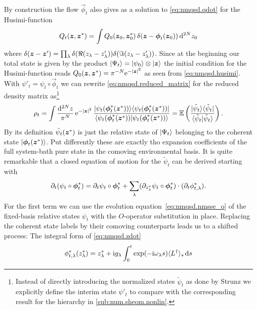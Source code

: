 By construction the flow $\vec\phi_t$ also gives as a solution to \autoref{eq:nmqsd.qdot} for the Husimi-function
\begin{equation*}
  Q_t(\boldsymbol{z}, {\boldsymbol{z}}^*) = \int Q_0(\boldsymbol{z}_0, {\boldsymbol{z}}^*_0) \, \delta(\boldsymbol{z} - \boldsymbol{\phi}_t(\boldsymbol{z}_0)) \, \mathrm{d}^{2N} z_0
\end{equation*}
where $\delta(\boldsymbol{z} - \boldsymbol{z}') = \prod_\lambda \delta(\Re(z_\lambda - z_\lambda')) \delta(\Im(z_\lambda - z_\lambda'))$.
Since at the beginning our total state is given by the product $| \Psi_t \rangle = | \psi_0 \rangle \otimes | \boldsymbol{z} \rangle$ the initial condition for the Husimi-function reads $Q_0(\zz, \cc\zz) = \pi^{-N} \exp[-\abs{\zz}^2]$ as seen from \autoref{eq:nmqsd.husimi}.
With $\psi'_t = \psi_t \circ \vec\phi_t$ we can rewrite \autoref{eq:nmqsd.reduced_matrix} for the reduced density matrix as\footnote{Instead of directly introducing the normalized states $\tilde\psi_t$ as done by Strunz \cite{St01_habil} we explicitly define the interim state $\psi'_t$ to compare with the corresponding result for the hierarchy in \autoref{sub:num.sheom.nonlin}.}
\begin{equation}
  \rho_t = \int \frac{\mathrm{d}^{2N}z}{\pi^N} \, \exp[-\abs{\zz}^2] \, \frac{\ket\psitphi \bra\psitphi}{\braket{\psitphi}{\psitphi}}
         = \E[ \frac{\ket{\tilde\psi_t}\bra{\tilde\psi_t}}{\braket{\tilde\psi_t}{\tilde\psi_t}}].
  \label{eq:nmqsd.reduced_matrix_comoving}
\end{equation}
By its definition $\tilde\psi_t({\boldsymbol{z}}^*)$ is just the relative state of $| \Psi_t \rangle$ belonging to the coherent state $| \boldsymbol{\phi}_t({\boldsymbol{z}}^*) \rangle$.
Put differently these are exactly tho expansion coefficients of the full system-bath pure state in the comoving environmental basis.
It is quite remarkable that a closed equation of motion for the $\tilde\psi_t$ can be derived starting with
\begin{equation}
  \partial_t (\psi_t \circ {\boldsymbol{\phi}}^*_t) = \partial_t\psi_t \circ {\boldsymbol{\phi}}^*_t + \sum_\lambda (\partial_{{z}^*_\lambda} \psi_t \circ {\boldsymbol{\phi}}^*_t) \cdot (\partial_t {\phi}^*_{t, \lambda}).
  \label{eq:nmqsd.psiprime_dot}
\end{equation}
For the first term we can use the evolution equation~\ref{eq:nmqsd.nmsse_o} of the fixed-basis relative states $\psi_t$ with the $O$-operator substitution in place.
Replacing the coherent state labels by their comoving counterparts leads us to a shifted process:
The integral form of \autoref{eq:nmqsd.zdot}
\begin{equation*}
  \ccphitla(\cc z_\lambda) = \cc z_\lambda + \ii g_\lambda \int_0^t \exp(-\ii \omega_\lambda s) \qmean{\adj L}_s \dd s
\end{equation*}
